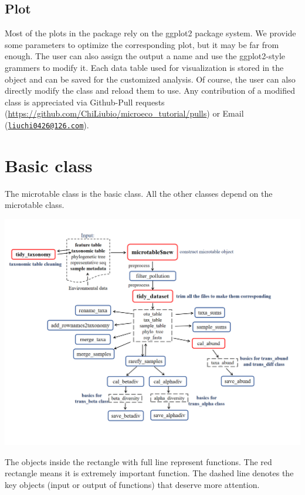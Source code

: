 \documentclass[
]{book}
\begin{document}
\hypertarget{plot}{%
\section{Plot}\label{plot}}

Most of the plots in the package rely on the ggplot2 package system.
We provide some parameters to optimize the corresponding plot, but it may be far from enough.
The user can also assign the output a name and use the ggplot2-style grammers to modify it.
Each data table used for visualization is stored in the object and can be saved for the customized analysis.
Of course, the user can also directly modify the class and reload them to use.
Any contribution of a modified class is appreciated via Github-Pull requests (\url{https://github.com/ChiLiubio/microeco_tutorial/pulls}) or Email (\href{mailto:liuchi0426@126.com}{\nolinkurl{liuchi0426@126.com}}).

\hypertarget{basic-class}{%
\chapter{Basic class}\label{basic-class}}

The microtable class is the basic class.
All the other classes depend on the microtable class.

\begin{center}\includegraphics[width=8000px]{Images/microtable_framework} \end{center}

The objects inside the rectangle with full line represent functions.
The red rectangle means it is extremely important function.
The dashed line denotes the key objects (input or output of functions) that deserve more attention.
\end{document}
